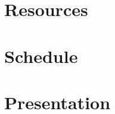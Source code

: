 \documentclass[12pt,a4paper,english,oneside]{article}
\begin{document}
\section{Resources}


\section{Schedule}




\section{Presentation}



%


% 

\renewcommand{\refname}{References}  %



\end{document}
